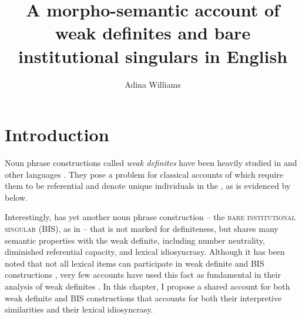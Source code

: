 \documentclass[output=paper,
modfonts
]{langscibook}
\title{A morpho-semantic account of weak definites and bare institutional singulars in English}
\author{%
 Adina Williams\affiliation{New York University}}
\begin{document}
\maketitle

\section{Introduction}\label{sec:williams:1}

Noun phrase constructions called \textit{weak definites} \citep{BirnerWard1994,Poesio1994} have been heavily studied in  \citep{CarlsonSussman2005,CarlsonEtAlii2006,Aguilar-GuevaraZwarsts2011,Aguilar-Guevara2014} and other languages \citep{Schwarz2009,Schwarz2013,Schwarz2014}. They pose a problem for classical accounts of  \citep{Frege1892,Russell1905,Hawkins1978,Sharvy1980,Heim1982} which require them to be referential and denote unique individuals in the , as is evidenced by  below. 

\begin{exe}
\end{exe}

Interestingly,  has yet another noun phrase construction -- the \textsc{bare institutional singular} (BIS), as in  -- that is not  marked for definiteness, but shares many semantic properties with the weak definite, including number neutrality, diminished referential capacity, and lexical idiosyncrasy. Although it has been noted that not all lexical items can participate in weak definite and BIS constructions \citep{Carlson2006b,CarlsonEtAlii2006,Aguilar-GuevaraZwarsts2011,Aguilar-GuevaraEtAlii2014,Aguilar-GuevaraSchulpen2014}, very few accounts have used this fact as fundamental in their analysis of weak definites \citep[but see][]{BaldwinEtAlii2006}. In this chapter, I propose a shared account for both weak definite and BIS constructions that accounts for both their interpretive similarities and their lexical idiosyncrasy. 
\end{document}
